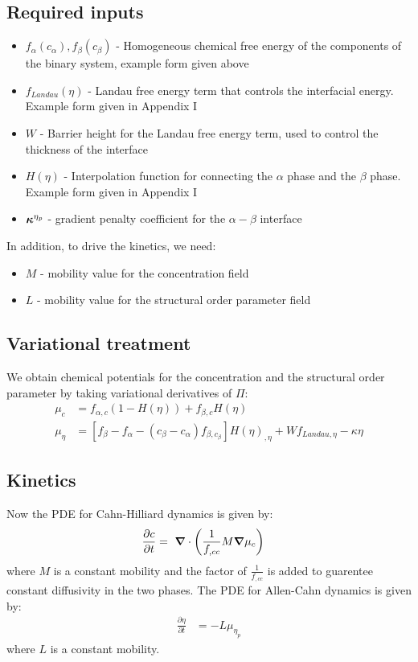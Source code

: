 \documentclass[11pt]{article}
\newcommand{\gv}[1]{\ensuremath{\mbox{\boldmath$ #1 $}}}
\newcommand{\grad}[1]{\gv{\nabla} #1} %
\renewcommand{\=}[1]{\stackrel{#1}{=}} %
\theoremstyle{definition}
\theoremstyle{remark}
\def\Bkappa{\mbox{\boldmath$\kappa$}}
\begin{document}
\subsection{Required inputs}
\begin{itemize}
\item $f_{\alpha}(c_{\alpha}), f_{\beta}(c_{\beta})$ - Homogeneous chemical free energy of the components of the binary system, example form given above
\item $f_{Landau}(\eta)$ - Landau free energy term that controls the interfacial energy. Example form given in Appendix I
\item $W$ - Barrier height for the Landau free energy term, used to control the thickness of the interface 
\item $H(\eta)$ - Interpolation function for connecting the $\alpha$ phase and the $\beta$ phase. Example form given in Appendix I
\item $\Bkappa^{\eta_p}$  - gradient penalty coefficient for the $\alpha - \beta$ interface
\end{itemize}
In addition, to drive the kinetics, we need:
\begin{itemize}
\item $M$  - mobility value for the concentration field
\item $L$  - mobility value for the structural order parameter field
\end{itemize}

\subsection{Variational treatment}
We obtain chemical potentials for the concentration and the structural order parameter by taking variational derivatives of $\Pi$:
\begin{align}
  \mu_{c}  &= f_{\alpha,c} \left( 1- H(\eta)\right) +f_{\beta,c} H(\eta) \\
  \mu_{\eta}  &= \left[ f_{\beta}-f_{\alpha} -(c_{\beta}-c_{\alpha}) f_{\beta,c_{\beta}} \right] H(\eta)_{,\eta} + W f_{Landau,\eta}- \kappa\eta
\end{align}

\subsection{Kinetics}
Now the PDE for Cahn-Hilliard dynamics is given by:
\begin{align}
  \frac{\partial c}{\partial t} &= ~\grad \cdot \left( \frac{1}{f_{,cc}}M \grad \mu_c \right) \label{CH_eqn}
  \end{align}
  where $M$ is a constant mobility and the factor of $\frac{1}{f_{,cc}}$ is added to guarentee constant diffusivity in the two phases. The PDE for Allen-Cahn dynamics is given by:
  \begin{align}
    \frac{\partial \eta}{\partial t} &= - L \mu_{\eta_p} \label{AC_eqn}
\end{align}
where  $L$ is a constant mobility. 
\end{document}
